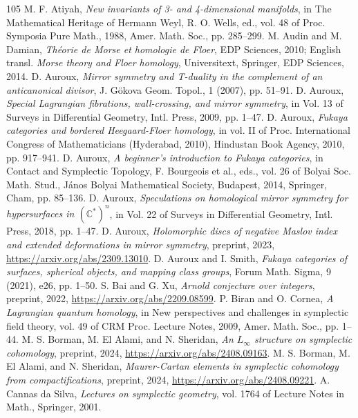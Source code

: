 \documentclass[UTF8,a4paper,11pt,fontset=windows]{ctexart}
\theoremstyle{cnthm}
\numberwithin{equation}{section}
\begin{document}
\begin{thebibliography}{105}
 M. F. Atiyah, \emph{New invariants of 3- and 4-dimensional manifolds}, in The Mathematical Heritage of Hermann Weyl, R. O. Wells, ed., vol. 48 of Proc. Symposia Pure Math., 1988, Amer. Math. Soc., pp. 285--299.
 M. Audin and M. Damian, \emph{Th\'eorie de Morse et homologie de Floer}, EDP Sciences, 2010; English transl. \emph{Morse theory and Floer homology}, Universitext, Springer, EDP Sciences, 2014.
 D. Auroux, \emph{Mirror symmetry and T-duality in the complement of an anticanonical divisor}, J. G\"okova Geom. Topol., 1 (2007), pp. 51--91.
 D. Auroux, \emph{Special Lagrangian fibrations, wall-crossing, and mirror symmetry}, in Vol. 13 of Surveys in Differential Geometry, Intl. Press, 2009, pp. 1--47.
 D. Auroux, \emph{Fukaya categories and bordered Heegaard-Floer homology}, in vol. II of Proc. International Congress of Mathematicians (Hyderabad, 2010), Hindustan Book Agency, 2010, pp. 917--941.
 D. Auroux, \emph{A beginner's introduction to Fukaya categories}, in Contact and Symplectic Topology, F. Bourgeois et al., eds., vol. 26 of Bolyai Soc. Math. Stud., J\'anos Bolyai Mathematical Society, Budapest, 2014, Springer, Cham, pp. 85--136.
 D. Auroux, \emph{Speculations on homological mirror symmetry for hypersurfaces in $(\mathbb{C}^*)^n$}, in Vol. 22 of Surveys in Differential Geometry, Intl. Press, 2018, pp. 1--47.
 D. Auroux, \emph{Holomorphic discs of negative Maslov index and extended deformations in mirror symmetry}, preprint, 2023, \url{https://arxiv.org/abs/2309.13010}.
 D. Auroux and I. Smith, \emph{Fukaya categories of surfaces, spherical objects, and mapping class groups}, Forum Math. Sigma, 9 (2021), e26, pp. 1--50.
 S. Bai and G. Xu, \emph{Arnold conjecture over integers}, preprint, 2022, \url{https://arxiv.org/abs/2209.08599}.
 P. Biran and O. Cornea, \emph{A Lagrangian quantum homology}, in New perspectives and challenges in symplectic field theory, vol. 49 of CRM Proc. Lecture Notes, 2009, Amer. Math. Soc., pp. 1--44.
 M. S. Borman, M. El Alami, and N. Sheridan, \emph{An $L_\infty$ structure on symplectic cohomology}, preprint, 2024, \url{https://arxiv.org/abs/2408.09163}.
 M. S. Borman, M. El Alami, and N. Sheridan, \emph{Maurer-Cartan elements in symplectic cohomology from compactifications}, preprint, 2024, \url{https://arxiv.org/abs/2408.09221}.
 A. Cannas da Silva, \emph{Lectures on symplectic geometry}, vol. 1764 of Lecture Notes in Math., Springer, 2001.

\end{thebibliography}
\end{document}
